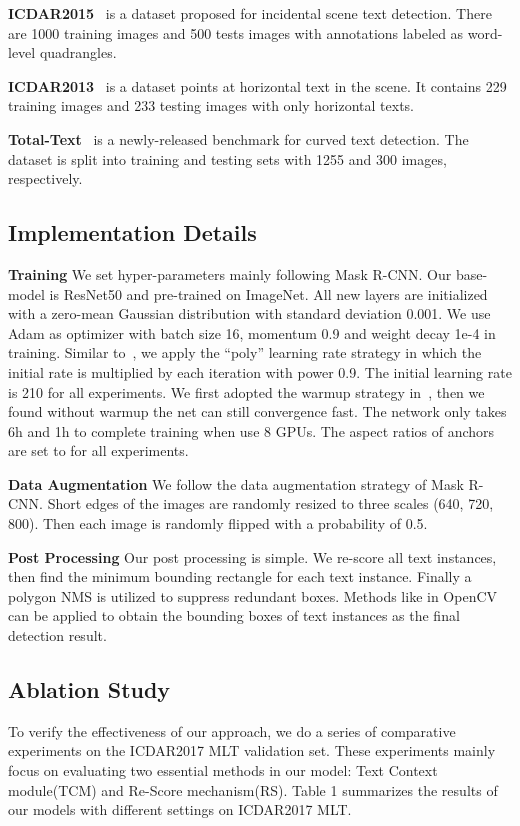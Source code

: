 \documentclass[letterpaper]{article} \usepackage{aaai19}  \usepackage{times}  \usepackage{helvet}  \usepackage{courier}  \usepackage{url}  \usepackage{graphicx}
\begin{document}
\textbf{ICDAR2015}~\cite{karatzas2015icdar} is a dataset proposed for incidental scene text detection. There are 1000 training images and 500 tests images with annotations labeled as word-level quadrangles.

\textbf{ICDAR2013}~\cite{karatzas2013icdar} is a dataset points at horizontal text in the scene. It contains 229 training images and 233 testing images with only horizontal texts. 


\textbf{Total-Text}~\cite{ch2017total} is a newly-released benchmark for curved text detection. 
The dataset is split into training and testing sets with 1255 and 300 images, respectively.

\subsection{Implementation Details}
\textbf{Training} We set hyper-parameters mainly following Mask R-CNN. Our base-model is ResNet50 and pre-trained on ImageNet. All new layers are initialized with a zero-mean Gaussian distribution with standard deviation 0.001. We use Adam as optimizer with batch size 16, momentum 0.9 and weight decay 1e-4 in training. Similar to~\cite{yu2018bisenet}, we apply the ``poly'' learning rate strategy in which the initial rate is multiplied by  each iteration with power 0.9. The initial learning rate is 
210 for all experiments. We first adopted the warmup strategy in~\cite{peng2017megdet}, then we found without warmup the net can still convergence fast. The network only takes 6h and 1h to complete training when use 8 GPUs. The aspect ratios of anchors are set to  for all experiments.

\textbf{Data Augmentation} 
We follow the data augmentation strategy of Mask R-CNN. Short edges of the images are randomly resized to three scales (640, 720, 800). Then each image is randomly flipped with a probability of 0.5.

\textbf{Post Processing}
Our post processing is simple. We re-score all text instances, then find the minimum bounding rectangle for each text instance.  Finally a polygon NMS is utilized to suppress redundant boxes.
Methods like  in OpenCV can be applied to obtain the bounding boxes of text instances as the final detection result.


\subsection{Ablation Study}
To verify the effectiveness of our approach, we do a series of comparative experiments on the ICDAR2017 MLT validation set. 
These experiments mainly focus on evaluating two essential methods in our model: Text Context module(TCM) and Re-Score mechanism(RS).
Table 1 summarizes the results of our models with different settings on ICDAR2017 MLT.
\end{document}
